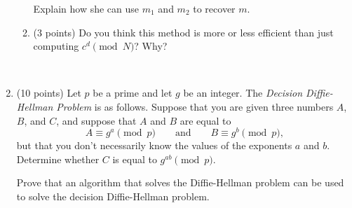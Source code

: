 \documentclass[11pt]{article}
\theoremstyle{plain}
\begin{document}
\begin{enumerate}
\begin{enumerate}
        Explain how she can use $m_1$ and $m_2$ to recover $m$.

        \vfill

        \item (3 points) Do you think this method is more or less efficient than just computing $c^d\pmod N$?
        Why?

        \vfill
    \end{enumerate}

    \newpage
    \ 
    \newpage

    \item (10 points)
    Let $p$ be a prime and let $g$ be an integer.
    The \emph{Decision Diffie-Hellman Problem} is as follows.
    Suppose that you are given three numbers $A$, $B$, and $C$, and suppose that $A$ and $B$ are equal to
    \[
        A\equiv g^a\pmod p\qquad\text{and}\qquad B\equiv g^b\pmod p,
    \]
    but that you don't necessarily know the values of the exponents $a$ and $b$.
    Determine whether $C$ is equal to $g^{ab}\pmod p$.

    Prove that an algorithm that solves the Diffie-Hellman problem can be used to solve the decision Diffie-Hellman problem.
    \newpage
    \ 


\end{enumerate}
\end{document}

